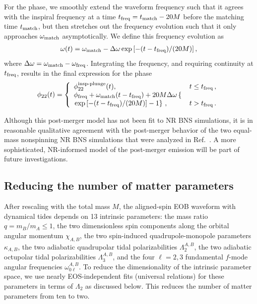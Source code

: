 \documentclass[prd,aps,letter,twocolumn,floatfix,notitlepage,nofootinbib]{revtex4-1}
\begin{document}
For the phase, we smoothly extend the waveform frequency such that it agrees with the inspiral frequency at a time $t_{\rm freq} = t_{\rm match} - 20M$ before the matching time $t_{\rm match}$, but then stretches out the frequency evolution such that it only approaches $\omega_{\rm match}$ asymptotically. We define this frequency evolution as
\begin{align}
\omega(t) = \omega_{\rm match} - \Delta\omega \exp\left[ -(t - t_{\rm freq}) / (20M) \right],
\end{align}
where $\Delta\omega = \omega_{\rm match} - \omega_{\rm freq}$. Integrating the frequency, and requiring continuity at $t_{\rm freq}$, results in the final expression for the phase
\begin{align}
\phi_{22}(t) = \left\{\begin{array}{ll}
\phi_{22}^{\textrm{insp-plunge}}(t), & t \leq t_{\rm freq} \,, \\
\phi_{\rm freq} + \omega_{\rm match}(t - t_{\rm freq}) + 20M \Delta\omega \left\{ \right. & \\
  \left. \exp\left[ -(t - t_{\rm freq}) / (20M) \right] - 1\right\} \,,& t > t_{\rm freq} \, .
\end{array}\right.
\end{align}

Although this post-merger model has not been fit to NR BNS simulations, it is in reasonable qualitative agreement with the post-merger behavior of the two equal-mass nonspinning NR BNS simulations that were analyzed in Ref.~\cite{Hinderer:2016eia}. A more sophisticated, NR-informed model of the post-merger emission will be part of future investigations.


\subsection{Reducing the number of matter parameters}

After rescaling with the total mass $M$, the aligned-spin EOB waveform with dynamical tides depends on 13 intrinsic parameters: the mass ratio $q=m_B/m_A\leq1$, the two dimensionless spin components along the orbital angular momentum $\chi_{A,B}$, the two spin-induced quadrupole-monopole parameters $\kappa_{A,B}$, the two adiabatic quadrupolar tidal polarizabilities $\Lambda_2^{A,B}$, the two adiabatic octupolar tidal polarizabilities $\Lambda_3^{A,B}$, and the four $\ell=2,3$ fundamental $f$-mode angular frequencies $\omega_{0\ell}^{A,B}$. To reduce the dimensionality of the intrinsic parameter space, we use nearly EOS-independent fits (universal relations) for these parameters in terms of $\Lambda_2$ as discussed below. This reduces the number of matter parameters from ten to two.
\end{document}
